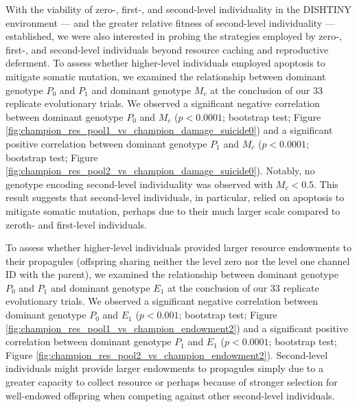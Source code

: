 With the viability of zero-, first-, and second-level individuality in the DISHTINY environment --- and the greater relative fitness of second-level individuality --- established, we were also interested in probing the strategies employed by zero-, first-, and second-level individuals beyond resource caching and reproductive deferment.
To assess whether higher-level individuals employed apoptosis to mitigate somatic mutation, we examined the relationship between dominant genotype $P_0$ and $P_1$ and dominant genotype $M_{c}$ at the conclusion of our 33 replicate evolutionary trials.
We observed a significant negative correlation between dominant genotype $P_0$ and $M_{c}$ ($p < 0.0001$; bootstrap test; Figure \ref{fig:champion_res_pool1_vs_champion_damage_suicide0}) and a significant positive correlation between dominant genotype $P_1$ and $M_{c}$ ($p < 0.0001$; bootstrap test; Figure \ref{fig:champion_res_pool2_vs_champion_damage_suicide0}).
Notably, no genotype encoding second-level individuality was observed with $M_{c} < 0.5$.
This result suggests that second-level individuals, in particular, relied on apoptosis to mitigate somatic mutation, perhaps due to their much larger scale compared to zeroth- and first-level individuals.

To assess whether higher-level individuals provided larger resource endowments to their propagules (offspring sharing neither the level zero nor the level one channel ID with the parent), we examined the relationship between dominant genotype $P_0$ and $P_1$ and dominant genotype $E_1$ at the conclusion of our 33 replicate evolutionary trials.
We observed a significant negative correlation between dominant genotype $P_0$ and $E_1$ ($p < 0.001$; bootstrap test; Figure \ref{fig:champion_res_pool1_vs_champion_endowment2}) and a significant positive correlation between dominant genotype $P_1$ and $E_1$ ($p <  0.0001$; bootstrap test; Figure \ref{fig:champion_res_pool2_vs_champion_endowment2}).
Second-level individuals might provide larger endowments to propagules simply due to a greater capacity to collect resource or perhaps because of stronger selection for well-endowed offspring when competing against other second-level individuals.
